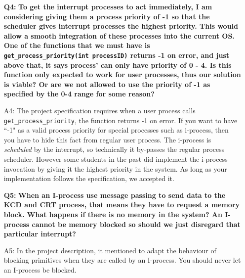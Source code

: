 \begin{itemize}
\item[{\bf Q4:}] {\bf To get the interrupt processes to act immediately, I am considering giving them a process priority of -1 so that the scheduler gives interrupt processes the highest priority. This would allow a smooth integration of these processes into the current OS. One of the functions that we must have is
    \\ \verb+get_process_priority(int processID)+ returns -1 on error, and just above that, it says process' can only have priority of 0 - 4. Is this function only expected to work for user processes, thus our solution is viable? Or are we not allowed to use the priority of -1 as specified by the 0-4 range for some reason?}
\item[A4:]
The project specification requires when a user process calls \verb+get_process_priority+, the function returns -1 on error. If you want to have ``-1" as a valid process priority for special processes such as i-process, then you have to hide this fact from regular user process. The i-process is {\em scheduled} by the interrupt, so technically it by-passes the regular process scheduler. However some students in the past did implement the i-process invocation by giving it the highest priority in the system. As long as your implementation follows the specification, we accepted it.

\item[{\bf Q5:}] {\bf When an I-process use message passing to send data to the KCD and CRT process, that means they have to request a memory block. What happens if there is no memory in the system? An I-process cannot be memory blocked so should we just disregard that particular interrupt?}
\item[A5:]
In the project description, it mentioned to adapt the behaviour of  blocking primitives when they are called by an I-process. You should never let an I-process be blocked.
\end{itemize}

